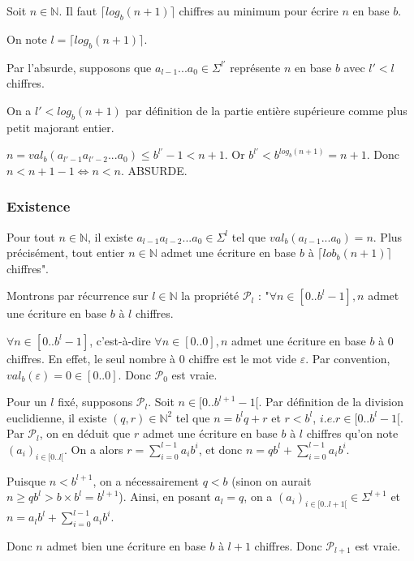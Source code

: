 \documentclass{scrartcl}
\begin{document}
				\noindent \prop Soit $n \in \mathbb{N}$. \newline
				Il faut $\lceil log_b(n+1) \rceil$ chiffres au minimum pour écrire $n$ en base $b$.

				\begin{demo}
					\item
						On note $l = \lceil log_b(n+1) \rceil$.

						Par l'absurde, supposons que $a_{l-1}...a_0 \in \Sigma^{l'}$ représente $n$ en base $b$ avec $l' < l$ chiffres.

						On a $l' < log_b(n+1)$ par définition de la partie entière supérieure comme plus petit majorant entier.

						$n = val_b(a_{l'-1}a_{l'-2}...a_0) \leqslant b^{l'}-1 < n+1$.
						Or $b^{l'} < b^{log_b(n+1)} = n+1$.
						Donc $n < n+1-1 \iff n < n$. ABSURDE.
				\end{demo}

			\subsubsection{Existence}

				\noindent \rem Pour tout $n \in \mathbb{N}$, il existe $a_{l-1}a_{l-2}...a_0 \in \Sigma^l$ tel que
				$val_b(a_{l-1}...a_0) = n$. Plus précisément, tout entier $n \in \mathbb{N}$ admet une écriture en base $b$
				à $\lceil lob_b(n+1) \rceil$ chiffres".

				\begin{demo}
					\item
						Montrons par récurrence sur $l \in \mathbb{N}$ la propriété $\mathcal{P}_l$ :
						"$\forall n \in [0..b^l-1], n$ admet une écriture en base $b$ à $l$ chiffres.

						$\forall n \in [0..b^l-1]$, c'est-à-dire $\forall n \in [0..0], n$ admet une écriture en base $b$ à $0$ chiffres.
						En effet, le seul nombre à $0$ chiffre est le mot vide $\varepsilon$.
						Par convention, $val_b(\varepsilon) = 0 \in [0..0]$.
						Donc $\mathcal{P}_0$ est vraie.

						Pour un $l$ fixé, supposons $\mathcal{P}_l$. Soit $n \in [0..b^{l+1}-1[$.
						Par définition de la division euclidienne, il existe $(q,r) \in \mathbb{N}^2$ tel que
						$n = b^lq+r$ et $r < b^l$, $i.e. r \in [0..b^l-1[$.
						Par $\mathcal{P}_l$, on en déduit que $r$ admet une écriture en base $b$ à $l$ chiffres qu'on note $(a_i)_{i \in [0..l[}$.
						On a alors $r = \sum_{i=0}^{l-1} a_ib^i$, et donc $n=qb^l + \sum_{i=0}^{l-1} a_ib^i$.

						Puisque $n < b^{l+1}$, on a nécessairement $q < b$ (sinon on aurait $n \geqslant qb^l > b \times b^l = b^{l+1}$).
						Ainsi, en posant $a_l = q$, on a $(a_i)_{i \in [0..l+1[} \in \Sigma^{l+1}$ et $n = a_lb^l + \sum_{i=0}^{l-1} a_ib^i$.

						Donc $n$ admet bien une écriture en base $b$ à $l+1$ chiffres. Donc $\mathcal{P}_{l+1}$ est vraie.
				\end{demo}
\end{document}
